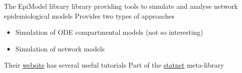 \documentclass[aspectratio=43]{beamer}
\begin{document}
\begin{frame}{The EpiModel library}
 library providing tools to simulate and analyse network epidemiological models
\vfill
Provides two types of approaches
\begin{itemize}
\item Simulation of ODE compartmental models (not so interesting)
\item Simulation of network models
\end{itemize}
\vfill
Their \href{https://www.epimodel.org}{website} has several useful tutorials
\vfill
Part of the \href{http://statnet.org/}{statnet} meta-library
\end{frame}
\end{document}
